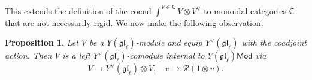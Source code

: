 \documentclass[11pt]{report}
\newtheorem{prop}[theorem]{Proposition}
\theoremstyle{definition}
\newtheorem{definition}[theorem]{Definition}
\theoremstyle{remark}
\theoremstyle{remark}
\newcommand{\Hom}{\operatorname{Hom}}
\newcommand{\C}{\mathbb{C}}
\begin{document}
This extends the definition of the coend $\int^{V \in \mathsf{C}} V \otimes V^\vee$ to monoidal categories $\mathsf{C}$ that are not necessarily rigid. We now make the following observation:

%
%

\begin{prop}
Let $V$ be a $Y(\mathfrak{gl}_\ell)$-module and equip $Y^\vee(\mathfrak{gl}_\ell)$ with the coadjoint action. Then $V$ is a left $Y^\vee(\mathfrak{gl}_\ell)$-comodule internal to $Y(\mathfrak{gl}_\ell)\mathsf{Mod}$ via
\begin{equation*}
V \to Y^\vee(\mathfrak{gl}_\ell) \otimes V, \quad v \mapsto \mathcal{R} (1 \otimes v).
\end{equation*}
\end{prop}
\end{document}
